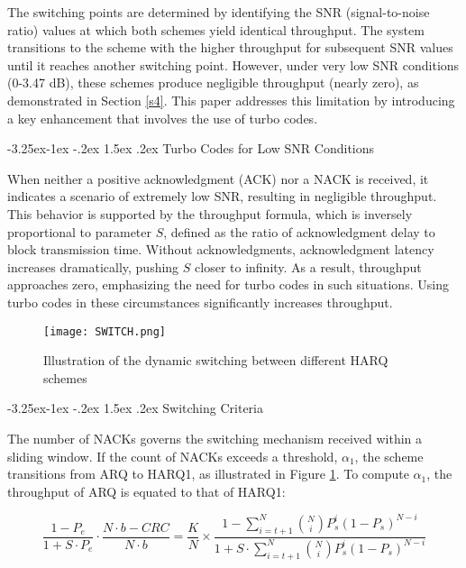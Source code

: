 \documentclass[sn-mathphys-num]{sn-jnl}
\makeatletter
\theoremstyle{thmstyleone}
\theoremstyle{thmstyletwo}%
\theoremstyle{thmstylethree}%
\renewcommand\subsubsection{%
  \@startsection{subsubsection}{3}{\z@}%
  {-3.25ex\@plus -1ex \@minus -.2ex}%
  {1.5ex \@plus .2ex}%
  {\normalfont\normalsize}}
\makeatother
\begin{document}
The switching points are determined by identifying the SNR (signal-to-noise ratio) values at which both schemes yield identical throughput. The system transitions to the scheme with the higher throughput for subsequent SNR values until it reaches another switching point. However, under very low SNR conditions (0-3.47 dB), these schemes produce negligible throughput (nearly zero), as demonstrated in Section \ref{s4}. This paper addresses this limitation by introducing a key enhancement that involves the use of turbo codes.

\subsubsection{Turbo Codes for Low SNR Conditions}

When neither a positive acknowledgment (ACK) nor a NACK is received, it indicates a scenario of extremely low SNR, resulting in negligible throughput. This behavior is supported by the throughput formula, which is inversely proportional to parameter $S$, defined as the ratio of acknowledgment delay to block transmission time. Without acknowledgments, acknowledgment latency increases dramatically, pushing $S$ closer to infinity. As a result, throughput approaches zero, emphasizing the need for turbo codes in such situations. Using turbo codes in these circumstances significantly increases throughput.

\begin{figure}[H]
    \centering
    \texttt{[image: SWITCH.png]}
    \caption{Illustration of the dynamic switching between different HARQ schemes}
    \label{fig:5}
\end{figure}

\subsubsection{Switching Criteria}

The number of NACKs governs the switching mechanism received within a sliding window. If the count of NACKs exceeds a threshold, $\alpha_1$, the scheme transitions from ARQ to HARQ1, as illustrated in Figure \ref{fig:5}. To compute $\alpha_1$, the throughput of ARQ is equated to that of HARQ1:

\begin{equation}
\frac{1 - P_e}{1 + S \cdot P_e} \cdot \frac{N \cdot b - CRC}{N \cdot b} = \frac{K}{N} \times \frac{1 - \sum_{i=t+1}^{N} \binom{N}{i} P_s^i (1-P_s)^{N-i}}{1 + S \cdot \sum_{i=t+1}^{N} \binom{N}{i} P_s^i (1-P_s)^{N-i}} \label{14}
\end{equation}
\end{document}
